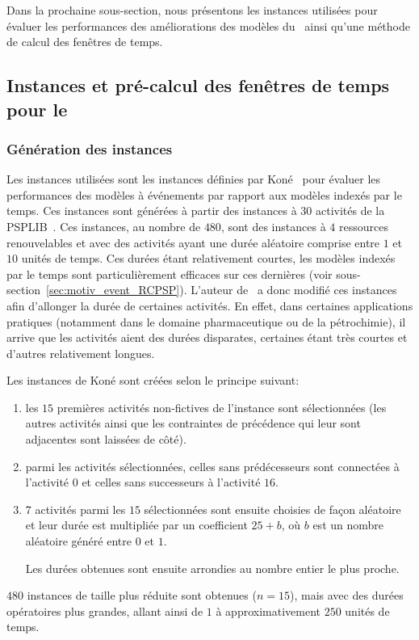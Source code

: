 Dans la prochaine sous-section, nous présentons les instances utilisées
pour évaluer les performances des améliorations des modèles du
\RCPSP~ainsi qu'une méthode de calcul des fenêtres de temps.
  
\subsection{Instances et pré-calcul des fenêtres de temps pour le
  \RCPSP}
\label{sec:instances_RCPSP}
\subsubsection{Génération des instances}
Les instances utilisées sont les instances définies par
Koné~\cite{theseOumar} pour évaluer les performances des modèles à
événements par rapport aux modèles indexés par le temps. Ces instances
sont générées à partir des instances à $30$ activités de la
PSPLIB~\cite{PSPLIB}. Ces instances, au nombre de $480$, sont des
instances à $4$ ressources renouvelables et avec des activités ayant
une durée aléatoire comprise entre $1$ et $10$ unités de temps. Ces
durées étant relativement courtes, les modèles indexés par le temps
sont particulièrement efficaces sur ces dernières (voir
sous-section~\ref{sec:motiv_event_RCPSP}). L'auteur de~\cite{theseOumar}
a donc modifié ces instances afin d'allonger la durée de certaines 
activités. En effet, dans certaines applications pratiques (notamment
dans le domaine pharmaceutique ou de la pétrochimie), il arrive que
les activités aient des durées disparates, certaines étant très
courtes et d'autres relativement longues.

Les instances de Koné sont créées selon le principe suivant: 
\begin{enumerate}
\item les $15$ premières activités non-fictives de l’instance sont
  sélectionnées (les autres activités ainsi que les contraintes de
  précédence qui leur sont adjacentes sont laissées de côté).
\item parmi les activités sélectionnées, celles sans prédécesseurs
  sont connectées à l’activité 0 et celles sans successeurs à l’activité
  $16$.
\item  $7$ activités parmi les $15$ sélectionnées sont ensuite
  choisies de façon aléatoire et leur durée est multipliée par un
  coefficient $25+b$, où $b$ est un nombre aléatoire généré entre $0$
  et  $1$.

  Les durées obtenues sont ensuite arrondies au nombre entier le plus
  proche. 
\end{enumerate}
$480$ instances de taille plus réduite sont obtenues ($n=15$), mais
avec des durées opératoires plus grandes, allant ainsi de $1$ à
approximativement $250$ unités de temps. 

